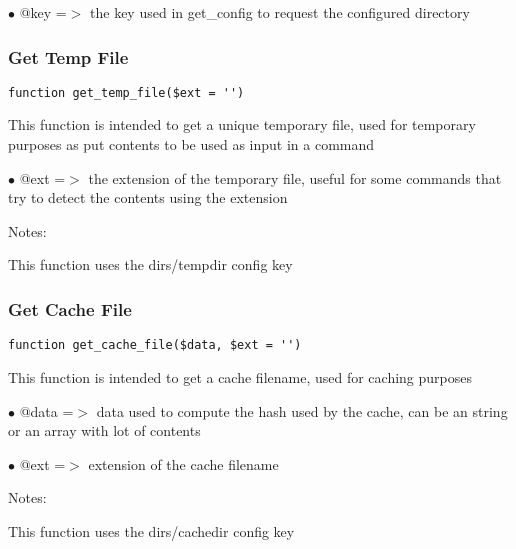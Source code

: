 \documentclass[a4paper]{article}
\begin{document}
\begin{compactitem}
\item[\color{myblue}$\bullet$] @key =$>$ the key used in get\_config to request the configured directory
\end{compactitem}

\hypertarget{toc130}{}
\subsubsection{Get Temp File}

\begin{lstlisting}
function get_temp_file($ext = '')
\end{lstlisting}

This function is intended to get a unique temporary file, used for temporary
purposes as put contents to be used as input in a command

\begin{compactitem}
\item[\color{myblue}$\bullet$] @ext =$>$ the extension of the temporary file, useful for some commands that
        try to detect the contents using the extension
\end{compactitem}

Notes:

This function uses the dirs/tempdir config key

\hypertarget{toc131}{}
\subsubsection{Get Cache File}

\begin{lstlisting}
function get_cache_file($data, $ext = '')
\end{lstlisting}

This function is intended to get a cache filename, used for caching purposes

\begin{compactitem}
\item[\color{myblue}$\bullet$] @data =$>$ data used to compute the hash used by the cache, can be an string or
         an array with lot of contents
\item[\color{myblue}$\bullet$] @ext  =$>$ extension of the cache filename
\end{compactitem}

Notes:

This function uses the dirs/cachedir config key

\hypertarget{toc132}{}
\end{document}
